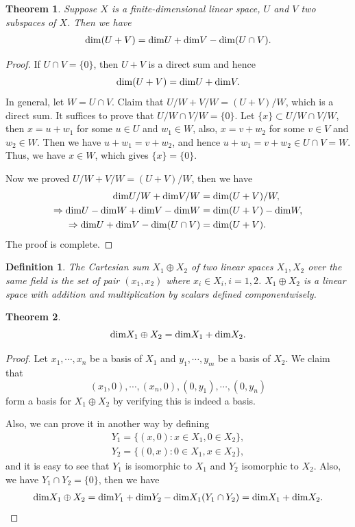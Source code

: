 \documentclass[10pt]{book}
\newtheorem{definition}{Definition}[chapter]
\newtheorem{theorem}{Theorem}[chapter]
\theoremstyle{definition}
\numberwithin{equation}{chapter}
\begin{document}
\medskip

\begin{theorem}
Suppose $X$ is a finite-dimensional linear space, $U$ and $V$ two subspaces of $X$. Then we have
\begin{align*}
    {\rm dim}(U+V) = {\rm dim}U + {\rm dim}V - {\rm dim}(U\cap V).
\end{align*}
\end{theorem}
\begin{proof}
If $U\cap V = \{0\}$, then $U+V$ is a direct sum and hence 
$${\rm dim}(U+V) = {\rm dim}U + {\rm dim}V.$$
In general, let $W = U\cap V$. Claim that $U/W+V/W = (U+V)/W$, which is a direct sum. It suffices to prove that $U/W\cap V/W = \{0\}$. Let $\{x\}\subset U/W\cap V/W$, then $x = u+w_1$ for some $u\in U$ and $w_1\in W$, also, $x = v+w_2$ for some $v\in V$ and $w_2\in W$. Then we have $u+w_1 = v+w_2$, and hence $u+w_1 = v+w_2\in U\cap V = W$. Thus, we have $x\in W$, which gives $\{x\} = \{0\}$.

Now we proved $U/W+V/W = (U+V)/W$, then we have 
\begin{align*}
    {\rm dim}U/W + {\rm dim}V/W & = {\rm dim}(U+V)/W,\\
    \Rightarrow {\rm dim}U - {\rm dim} W + {\rm dim} V - {\rm dim}W & = {\rm dim}(U+V) - {\rm dim}W,\\ 
    \Rightarrow {\rm dim}U + {\rm dim} V - {\rm dim}(U\cap V) & = {\rm dim}(U+V).
\end{align*}
The proof is complete.
\end{proof}

\medskip

\begin{definition}
The Cartesian sum $X_1\oplus X_2$ of two linear spaces $X_1, X_2$ over the same field is the set of pair $(x_1,x_2)$ where $x_i\in X_i, i = 1,2$. $X_1\oplus X_2$ is a linear space with addition and multiplication by scalars defined componentwisely. 
\end{definition}

\medskip

\begin{theorem}
$${\rm dim}X_1\oplus X_2 = {\rm dim}X_1 + {\rm dim}X_2.$$
\end{theorem}
\begin{proof}
Let $x_1, \cdots, x_n$ be a basis of $X_1$ and $y_1, \cdots, y_m$ be a basis of $X_2$. We claim that 
$$(x_1,0),\cdots, (x_n,0), (0,y_1), \cdots, (0,y_n)$$ 
form a basis for $X_1\oplus X_2$ by verifying this is indeed a basis.

Also, we can prove it in another way by defining
\begin{align*}
    Y_1 = \{(x,0): x\in X_1, 0\in X_2\}, \\
    Y_2 = \{(0,x): 0\in X_1, x\in X_2\},
\end{align*}
and it is easy to see that $Y_1$ is isomorphic to $X_1$ and $Y_2$ isomorphic to $X_2$. Also, we have $Y_1\cap Y_2 = \{0\}$, then we have 
\begin{align*}
    {\rm dim}X_1\oplus X_2 = {\rm dim}Y_1 + {\rm dim}Y_2 - {\rm dim}X_1(Y_1\cap Y_2) = {\rm dim}X_1 + {\rm dim}X_2.
\end{align*}
\end{proof}
\end{document}
